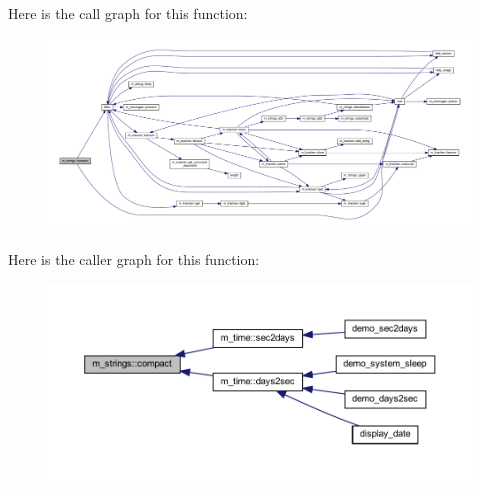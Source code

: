 Here is the call graph for this function\+:
\nopagebreak
\begin{figure}[H]
\begin{center}
\leavevmode
\includegraphics[width=350pt]{namespacem__strings_a929c032267cb990ad4991fab4aed1d57_cgraph}
\end{center}
\end{figure}
Here is the caller graph for this function\+:
\nopagebreak
\begin{figure}[H]
\begin{center}
\leavevmode
\includegraphics[width=350pt]{namespacem__strings_a929c032267cb990ad4991fab4aed1d57_icgraph}
\end{center}
\end{figure}
\mbox{\label{namespacem__strings_a818d715927dd61c1be6df5d2cdec4e4c}} 
